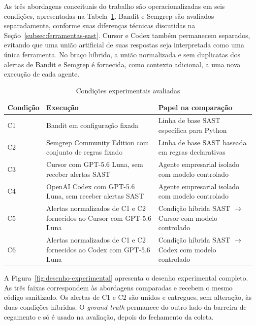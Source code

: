 As três abordagens conceituais do trabalho são operacionalizadas em seis condições, apresentadas na Tabela~\ref{tab:condicoes-experimentais}. Bandit e Semgrep são avaliados separadamente, conforme suas diferenças técnicas discutidas na Seção~\ref{subsec:ferramentas-sast}. Cursor e Codex também permanecem separados, evitando que uma união artificial de suas respostas seja interpretada como uma única ferramenta. No braço híbrido, a união normalizada e sem duplicatas dos alertas de Bandit e Semgrep é fornecida, como contexto adicional, a uma nova execução de cada agente.

\begin{table}[htb]
\ABNTEXfontereduzida
\caption{\label{tab:condicoes-experimentais}Condições experimentais avaliadas}
\centering
\begin{tabularx}{\textwidth}{|l|X|X|}
\hline
\textbf{Condição} & \textbf{Execução} & \textbf{Papel na comparação} \\
\hline
C1 & Bandit em configuração fixada & Linha de base SAST específica para Python \\
\hline
C2 & Semgrep Community Edition com conjunto de regras fixado & Linha de base SAST baseada em regras declarativas \\
\hline
C3 & Cursor com GPT-5.6 Luna, sem receber alertas SAST & Agente empresarial isolado com modelo controlado \\
\hline
C4 & OpenAI Codex com GPT-5.6 Luna, sem receber alertas SAST & Agente empresarial isolado com modelo controlado \\
\hline
C5 & Alertas normalizados de C1 e C2 fornecidos ao Cursor com GPT-5.6 Luna & Condição híbrida SAST $\rightarrow$ Cursor com modelo controlado \\
\hline
C6 & Alertas normalizados de C1 e C2 fornecidos ao Codex com GPT-5.6 Luna & Condição híbrida SAST $\rightarrow$ Codex com modelo controlado \\
\hline
\end{tabularx}
\end{table}

A Figura~\ref{fig:desenho-experimental} apresenta o desenho experimental completo. As três faixas correspondem às abordagens comparadas e recebem o mesmo código sanitizado. Os alertas de C1 e C2 são unidos e entregues, sem alteração, às duas condições híbridas. O \textit{ground truth} permanece do outro lado da barreira de cegamento e só é usado na avaliação, depois do fechamento da coleta.

